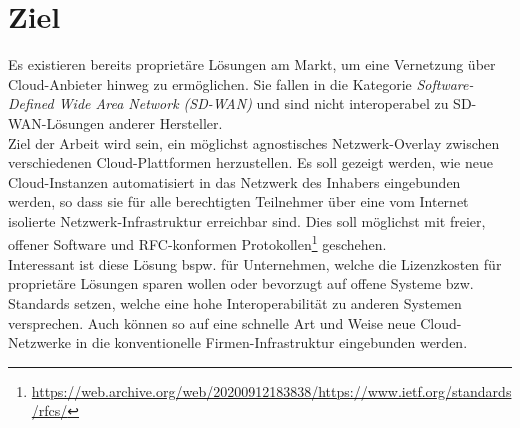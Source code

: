\section{Ziel}

Es existieren bereits proprietäre Lösungen am Markt, um eine Vernetzung über Cloud-Anbieter hinweg zu ermöglichen. Sie fallen in die Kategorie \textit{Software-Defined Wide Area Network (SD-WAN)} und sind nicht interoperabel zu SD-WAN-Lösungen anderer Hersteller.\\
Ziel der Arbeit wird sein, ein möglichst agnostisches Netzwerk-Overlay zwischen verschiedenen Cloud-Plattformen herzustellen. Es soll gezeigt werden, wie neue Cloud-Instanzen automatisiert in das Netzwerk des Inhabers eingebunden werden, so dass sie für alle berechtigten Teilnehmer über eine vom Internet isolierte Netzwerk-Infrastruktur erreichbar sind. Dies soll möglichst mit freier, offener Software und RFC-konformen Protokollen\footnote{\url{https://web.archive.org/web/20200912183838/https://www.ietf.org/standards/rfcs/}} geschehen.\\
Interessant ist diese Lösung bspw. für Unternehmen, welche die Lizenzkosten für proprietäre Lösungen sparen wollen oder bevorzugt auf offene Systeme bzw. Standards setzen, welche eine hohe Interoperabilität zu anderen Systemen versprechen. Auch können so auf eine schnelle Art und Weise neue Cloud-Netzwerke in die konventionelle Firmen-Infrastruktur eingebunden werden.


